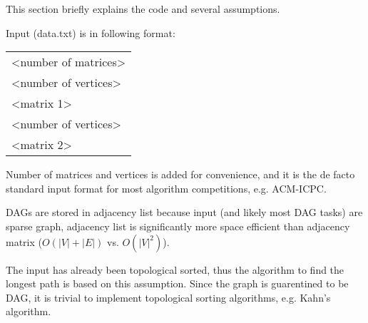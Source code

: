 \documentclass[./report.tex]{subfiles}
\begin{document}
This section briefly explains the code and several assumptions.

Input (data.txt) is in following format:

\begin{tabular}{l}
<number of matrices>\\
<number of vertices>\\
<matrix 1>\\
<number of vertices>\\
<matrix 2>\\
\end{tabular}

Number of matrices and vertices is added for convenience, and it is the de facto standard input format for most algorithm competitions, e.g. ACM-ICPC.

DAGs are stored in adjacency list because input (and likely most DAG tasks) are sparse graph, adjacency list is significantly more space efficient than adjacency matrix ($O (|V|+|E|)$ vs. $O (|V|^2)$).

The input has already been topological sorted, thus the algorithm to find the longest path is based on this assumption. Since the graph is guarentined to be DAG, it is trivial to implement topological sorting algorithms, e.g. Kahn's algorithm.
\end{document}
